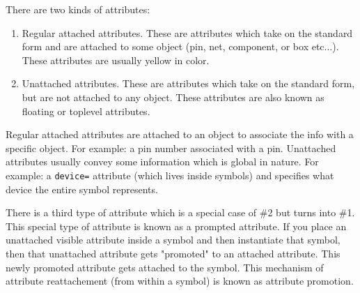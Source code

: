 \documentclass{article}
\begin{document}
There are two kinds of attributes:
\begin{enumerate}
\item Regular attached attributes.  These are attributes which take on
the standard form and are attached to some object (pin, net,
component, or box etc...).  These attributes are usually yellow in
color.
                
\item Unattached attributes.  These are attributes which take on the
standard form, but are not attached to any object.  These attributes
are also known as floating or toplevel attributes.
\end{enumerate}

Regular attached attributes are attached to an object to associate the
info with a specific object.  For example: a pin number associated
with a pin.  Unattached attributes usually convey some information
which is global in nature.  For example: a {\tt device=} attribute (which
lives inside symbols) and specifies what device the entire symbol
represents.

There is a third type of attribute which is a special case of \#2 but
turns into \#1.  This special type of attribute is known as a prompted
attribute.  If you place an unattached visible attribute inside a
symbol and then instantiate that symbol, then that unattached
attribute gets "promoted" to an attached attribute.  This newly
promoted attribute gets attached to the symbol.  This mechanism of
attribute reattachement (from within a symbol) is known as attribute
promotion.
\end{document}
